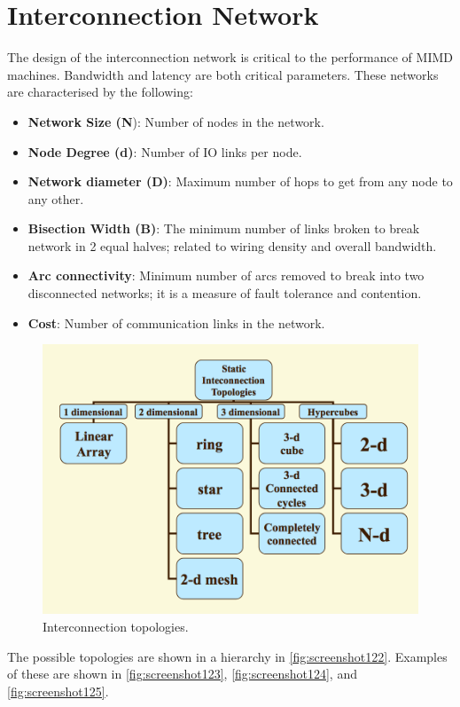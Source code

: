 \section{Interconnection Network}
The design of the interconnection network is critical to the performance of MIMD machines. Bandwidth and latency are both critical parameters. These networks are characterised by the following: \begin{itemize}
\item \textbf{Network Size (N}): Number of nodes in the network.
\item \textbf{Node Degree (d)}: Number of IO links per node.
\item \textbf{Network diameter (D)}: Maximum number of hops to get from any node to any other.
\item \textbf{Bisection Width (B)}: The minimum number of links broken to break network in 2 equal halves; related to wiring density and overall bandwidth.
\item \textbf{Arc connectivity}: Minimum number of arcs removed to break into two disconnected networks; it is a measure of fault tolerance and contention.
\item \textbf{Cost}: Number of communication links in the network.
\end{itemize}

\begin{figure}
\centering
\includegraphics[width=0.7\linewidth]{screenshot122}
\caption{Interconnection topologies.}
\label{fig:screenshot122}
\end{figure}

The possible topologies are shown in a hierarchy in \autoref{fig:screenshot122}. Examples of these are shown in \autoref{fig:screenshot123}, \autoref{fig:screenshot124}, and \autoref{fig:screenshot125}.

